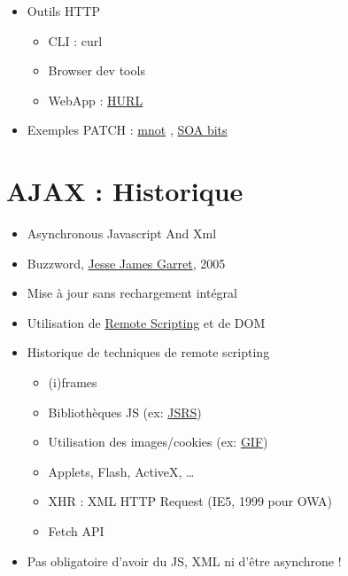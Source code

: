 \begin{itemize}
\tightlist
\item
  Outils HTTP

  \begin{itemize}
  \tightlist
  \item
    CLI : curl
  \item
    Browser dev tools
  \item
    WebApp : \href{http://hurl.it/}{HURL}
  \end{itemize}
\item
  Exemples PATCH :
  \href{http://www.mnot.net/blog/2012/09/05/patch}{mnot} ,
  \href{http://soabits.blogspot.ch/2013/01/http-put-patch-or-post-partial-updates.html}{SOA
  bits}
\end{itemize}

\hypertarget{ajax-historique}{%
\section{AJAX : Historique}\label{ajax-historique}}

\begin{itemize}
\tightlist
\item
  Asynchronous Javascript And Xml
\item
  Buzzword,
  \href{http://web.archive.org/web/20110102130434/http://www.adaptivepath.com/ideas/essays/archives/000385.php}{Jesse
  James Garret}, 2005
\item
  Mise à jour sans rechargement intégral
\item
  Utilisation de
  \href{https://en.wikipedia.org/wiki/Remote_scripting}{Remote
  Scripting} et de DOM
\item
  Historique de techniques de remote scripting

  \begin{itemize}
  \tightlist
  \item
    (i)frames
  \item
    Bibliothèques JS (ex:
    \href{http://www.ashleyit.com/rs/jsrs/test.htm}{JSRS})
  \item
    Utilisation des images/cookies (ex:
    \href{http://web.archive.org/web/20100916110710/http://depressedpress.com/Content/Development/JavaScript/Articles/GIFAsPipe/Index.cfm}{GIF})
  \item
    Applets, Flash, ActiveX, \ldots{}
  \item
    {XHR : XML HTTP Request} (IE5, 1999 pour OWA)
  \item
    Fetch API
  \end{itemize}
\item
  Pas obligatoire d'avoir du JS, XML ni d'être asynchrone !
\end{itemize}

